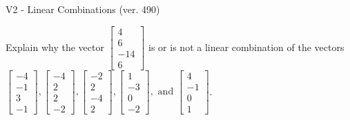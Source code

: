 \begin{exercise}
  \begin{exerciseTitle}V2 - Linear Combinations (ver. 490)\end{exerciseTitle}
  \begin{exerciseStatement}
    Explain why the vector \(\left[\begin{array}{c}
4 \\
6 \\
-14 \\
6
\end{array}\right]\)  is or is not a linear 
	combination of the vectors \(\left[\begin{array}{c}
-4 \\
-1 \\
3 \\
-1
\end{array}\right] , \left[\begin{array}{c}
-4 \\
2 \\
2 \\
-2
\end{array}\right] , \left[\begin{array}{c}
-2 \\
2 \\
-4 \\
2
\end{array}\right] , \left[\begin{array}{c}
1 \\
-3 \\
0 \\
-2
\end{array}\right] , \text{ and } \left[\begin{array}{c}
4 \\
-1 \\
0 \\
1
\end{array}\right]\).
	



\end{exerciseStatement}
\end{exercise}
